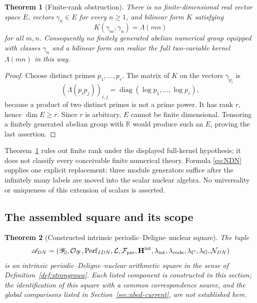 \documentclass[11pt]{amsart}
\newtheorem{theorem}{Theorem}[section]
\theoremstyle{definition}
\theoremstyle{remark}
\newcommand{\R}{\mathbb R}
\begin{document}
\begin{theorem}[Finite-rank obstruction]\label{thm:finiteNSnogo}
There is no finite-dimensional real vector space $E$, vectors
$\gamma_n\in E$ for every $n\geq1$, and bilinear form $K$ satisfying
\begin{equation}\label{eq:finiteRankImpossible}
 K(\gamma_m,\gamma_n)=\Lambda(mn)
\end{equation}
for all $m,n$.  Consequently no finitely generated abelian numerical group
equipped with classes $\gamma_n$ and a bilinear form can realize the full
two-variable kernel $\Lambda(mn)$ in this way.
\end{theorem}

\begin{proof}
Choose distinct primes $p_1,\ldots,p_r$.  The matrix of $K$ on the vectors
$\gamma_{p_i}$ is
\[
 (\Lambda(p_ip_j))_{i,j}
   =\operatorname{diag}(\log p_1,\ldots,\log p_r),
\]
because a product of two distinct primes is not a prime power.  It has rank
$r$, hence $\dim E\geq r$.  Since $r$ is arbitrary, $E$ cannot be finite
dimensional.  Tensoring a finitely generated abelian group with $\R$ would
produce such an $E$, proving the last assertion.
\end{proof}

Theorem~\ref{thm:finiteNSnogo} rules out finite rank under the displayed
full-kernel hypothesis; it does not classify every conceivable finite
numerical theory.  Formula \eqref{eq:NDN} supplies one explicit replacement:
three module generators suffice after the infinitely many labels are moved
into the scalar nuclear algebra.  No universality or uniqueness of this
extension of scalars is asserted.

\subsection{The assembled square and its scope}

\begin{theorem}[Constructed intrinsic periodic--Deligne--nuclear square]
\label{thm:rowaDN}
The tuple
\begin{equation}\label{eq:ADN}
 \mathscr A_{DN}=
 (\mathscr Y_{\mathbb S},\mathcal O_{\mathscr Y},
  \operatorname{Perf}_{IDN},\mathcal L,\mathcal F_{\rm per},
  \mathbf H^{\rm int},\lambda_{\rm int},\lambda_{\mathrm{code}},
  \lambda_C,\lambda_G,\mathcal N_{DN})
\end{equation}
is an intrinsic periodic--Deligne--nuclear arithmetic square in the sense
of Definition~\ref{def:strongrowa}.  Each listed component is constructed
in this section; the identification of this square with a common
correspondence source, and the global comparisons listed in
Section~\ref{sec:abcd-current}, are not established here.
\end{theorem}
\end{document}
